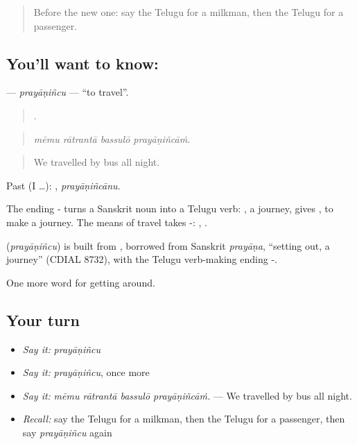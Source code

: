 \begin{quote}
Before the new one: say the Telugu for a milkman, then the Telugu for a passenger.
\end{quote}

\subsection*{You'll want to know: }
\textbf{} — \emph{prayāṇiñcu} — \textquotedblleft{}to travel\textquotedblright{}.

\begin{quote}
   .
\end{quote}

\begin{quote}
\emph{mēmu rātrantā bassulō prayāṇiñcāṁ.}
\end{quote}

\begin{quote}
We travelled by bus all night.
\end{quote}

Past (I …): , \emph{prayāṇiñcānu}.

The ending - turns a Sanskrit noun into a Telugu verb: , a journey, gives , to make a journey. The means of travel takes -: , .

\begin{cousinweb}
\textbf{} (\emph{prayāṇiñcu}) is built from , borrowed from Sanskrit \emph{prayāṇa}, \textquotedblleft{}setting out, a journey\textquotedblright{} (CDIAL 8732), with the Telugu verb-making ending -.
\end{cousinweb}

\begin{grammarlens}[title={What you've built}]
One more word for getting around.
\end{grammarlens}

\subsection*{Your turn}
\begin{itemize}
\raggedright
  \item \emph{Say it:} \emph{prayāṇiñcu}
  \item \emph{Say it:} \emph{prayāṇiñcu}, once more
  \item \emph{Say it:} \emph{mēmu rātrantā bassulō prayāṇiñcāṁ.} — We travelled by bus all night.
  \item \emph{Recall:} say the Telugu for a milkman, then the Telugu for a passenger, then say \emph{prayāṇiñcu} again
\end{itemize}

